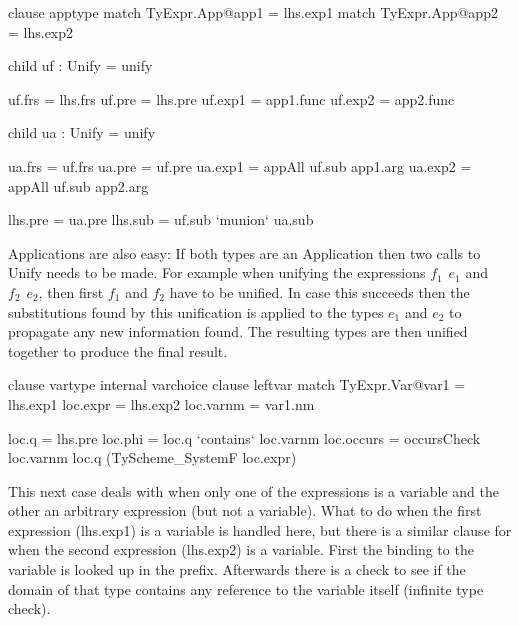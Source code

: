 \begin{code}
clause apptype
  match TyExpr.App@app1 = lhs.exp1
  match TyExpr.App@app2 = lhs.exp2
  
  child uf : Unify = unify
  
  uf.frs   = lhs.frs
  uf.pre   = lhs.pre
  uf.exp1  = app1.func
  uf.exp2  = app2.func
  
  child ua : Unify = unify
  
  ua.frs   = uf.frs
  ua.pre   = uf.pre
  ua.exp1  = appAll uf.sub app1.arg
  ua.exp2  = appAll uf.sub app2.arg
           
  lhs.pre  = ua.pre
  lhs.sub  = uf.sub `munion` ua.sub
\end{code}
Applications are also easy: If both types are an Application then two calls to Unify needs to be made. For example when unifying the expressions $f_1 \hspace{5pt} e_1$ and $f_2 \hspace{5pt} e_2$, then first $f_1$ and $f_2$ have to be unified. In case this succeeds then the substitutions found by this unification is applied to the types $e_1$ and $e_2$ to propagate any new information found. The resulting types are then unified together to produce the final result.

\begin{code}
clause vartype   
  internal varchoice
    clause leftvar
      match TyExpr.Var@var1 = lhs.exp1
      loc.expr  = lhs.exp2
      loc.varnm = var1.nm

      loc.q   = lhs.pre
      loc.phi = loc.q `contains` loc.varnm
      loc.occurs = occursCheck  loc.varnm loc.q 
                                (TyScheme_SystemF loc.expr)
\end{code}
This next case deals with when only one of the expressions is a variable and the other an arbitrary expression (but not a variable). What to do when the first expression (lhs.exp1) is a variable is handled here, but there is a similar clause for when the second expression (lhs.exp2) is a variable. 
First the binding to the variable is looked up in the prefix. Afterwards there is a check to see if the domain of that type contains any reference to the variable itself (infinite type check).
                           
